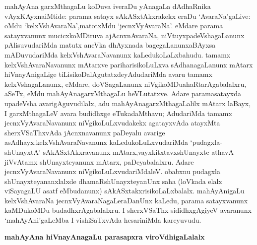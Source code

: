 mahAyAna garxMthagaLu koDuva iveraDu yAnagaLa dAdhaRnika vAyxKAyxna\break iMtide: parama satayx sAkASxtAkxrakekx eraDu `AvaraNa'gaLive: oMdu `kelxVshAvaraNa',\break matotxMdu `jecnxVyAvaraNa'. eMdare parama satayxvanunx mucicxkoMDiruva ajAcnxnA\-varaNa, niVtuyxpadeVshagaLanunx pAlisuvudariMda matutx aneVka dhAyxnada bagegaLanunx\break aBAyxsa mADuvudariMda kelxVshAvaraNa\-vanunx kaLedukoLaLxbahudu. tamamx kelxVshAvaraNa\-vanunx mAtarxve pariharisikoLuLxva sAdhanagaLanunx mAtarx hiVnayAnigaLige tiLisi\-koDa\-lAgutatxdeyAdudariMda avaru tamamx kelxVshagaLanunx, eMdare, doVSagaLanunx niVgikoMDu\break ahaRtarAgabalalxru, aSeTx, eMdu mahAyAnagarxMthagaLu heVLutatxve. Adare parama\break satayxda upadeVsha avarigAguvudilalx, adu mahAyAnagarxMthagaLalilx mAtarx laBayx, I garxMthagaLeV avara budidhxge eTukadaMthavu; AdudariMda tamamx jecnxVyAvaraNavanunx niVgi\-koLuLxvudakekx agatayxvAda atayxMta sherxVSaThxvAda jAcnxnavanunx paDeyalu avarige asAdhayx.\break kelxVshAvaraNavanunx kaLedukoLuLxvudariMda `pudagxla-shUnayxtA' sAkASxtAkxravanunx mAtarx,\break vayxkitxtavxshUnayxte athavA jiVvAtamx shUnayxteyanunx mAtarx, paDeyabalalxru. Adare jecnxVyA\-varaNavanunx niVgikoLuLxvudariMdaleV. obabxnu pudagxla shUnayxteyananxlalxde dhamaR\-shUnayxte\-yanUnx saha (loVkada elalx viSayagaLU asatf eMbudanunx) sAkASxtakxrisikoLaLxbalalx. mahAyAnigaLu kelxVshAvaraNa jecnxVyAvaraNagaLeraDanUnx kaLedu, parama satayxvanunx kaMDukoMDu budadhx\-rAgabalalxru. I sherxVSaThx sididhxgAgiyeV avaranunx `mahAyAni'gaLeMba I vishiSaTxvAda hesariniMda kareyuvudu.

\begin{center}
{\textbf{\Large mahAyAna hiVnayAnagaLu parasapxra viroVdhigaLalalx}}
\end{center}


